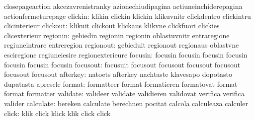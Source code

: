                            closepageaction           akcezavrenistranky
                           azionechiudipagina        actiuneinchiderepagina
                           actionfermeturepage
                  clickin: klikin                    clickin
                           klickin                   klikuvnitr
                           clickdentro               clickintru
                           clicinterieur
                 clickout: klikuit                   clickout
                           klickaus                  klikvne
                           clickfuori                clickies
                           clicexterieur
                 regionin: gebiedin                  regionin
                           regionin                  oblastuvnitr
                           entraregione              regiuneintrare
                           entreregion
                regionout: gebieduit                 regionout
                           regionaus                 oblastvne
                           esciregione               regiuneiesire
                           regionexterieure
                  focusin: focusin                   focusin
                           focusin                   focusin
                           focusin                   focusin
                           focusin
                 focusout: focusuit                  focusout
                           focusout                  focusout
                           focusout                  focusout
                           focusout
                 afterkey: natoets                   afterkey
                           nachtaste                 klavesapo
                           dopotasto                 dupatasta
                           aprescle
                   format: formatteer                format
                           formatieren               formatovat
                           format                    format
                           formatter
                 validate: valideer                  validate
                           validieren                validovat
                           verifica                  verifica
                           valider
                calculate: bereken                   calculate
                           berechnen                 pocitat
                           calcola                   calculeaza
                           calculer
                    click: klik                      click
                           klick                     klik
                           click                     click
